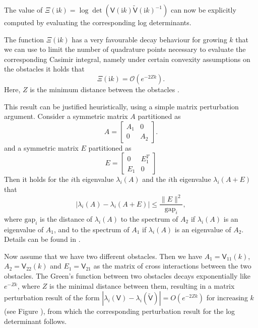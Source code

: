 The value of $\Xi(\mathrm{i}k) = \log\det(\mathsf{V}(\mathrm{i}k)\tilde{\mathsf{V}}(\mathrm{i}k)^{-1})$ can now be explicitly computed by evaluating the corresponding log determinants.

The function $\Xi(\mathrm{i}k)$ has a very favourable decay behaviour for growing $k$ that we can use to limit the number of quadrature points necessary to evaluate the corresponding Casimir integral, namely under certain convexity assumptions on the obstacles it holds that
$$
\Xi(\mathrm{i}k) = \mathcal{O}(e^{-2Zk}).
$$
Here, $Z$ is the minimum distance between the obstacles  \cite[Theorem 4.1]{fang2022trace}.

This result can be justified heuristically, using a simple matrix perturbation argument. Consider a symmetric matrix $A$ partitioned as
$$
A = \begin{bmatrix}A_1 & 0\\
                              0   & A_2
       \end{bmatrix}.
$$
and a symmetric matrix $E$ partitioned as
$$
E= \begin{bmatrix}0 & E_1^T\\
     E_1 & 0
     \end{bmatrix}
$$
Then it holds for the $i$th eigenvalue $\lambda_i(A)$ and the $i$th eigenvalue $\lambda_i(A+E)$ that
$$
|\lambda_i(A) - \lambda_i(A+E)| \leq \frac{\|E\|^2}{\text{gap}_i},
$$
where $\text{gap}_i$ is the distance of $\lambda_i(A)$ to the spectrum of $A_2$ if $\lambda_i(A)$ is an eigenvalue of $A_1$, and to the spectrum of $A_1$ if $\lambda_i(A)$ is an eigenvalue of $A_2$. Details can be found in  
\cite{mathias1998quadratic}.

Now assume that we have two different obstacles. Then we have $A_1 = \mathsf{V}_{11}(k)$, $A_2 = \mathsf{V}_{22}(k)$ and $E_1 = \mathsf{V}_{21}$ as the matrix of cross interactions 
between the two obstacles. The Green's function between two obstacles decays exponentially like $e^{-Zk}$, where $Z$ is the minimal distance between them, 
resulting in a matrix perturbation result of the form $|\lambda_i(\mathsf{V}) - \lambda_i(\tilde{\mathsf{V}})| = O(e^{-2Zk})$ for increasing $k$ (see Figure 
), from 
which the corresponding perturbation result for the log determinant follows.

